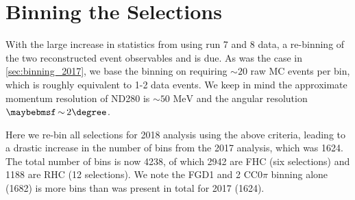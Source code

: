 \section{Binning the Selections}
With the large increase in statistics from using run 7 and 8 data, a re-binning of the two reconstructed event observables \pmu and \cosmu is due. As was the case in \autoref{sec:binning_2017}, we base the binning on requiring $\sim20$ raw MC events per bin, which is roughly equivalent to 1-2 data events. We keep in mind the approximate momentum resolution of ND280 is $\sim50\text{ MeV}$ and the angular resolution $\sim2\degree$.

Here we re-bin all selections for 2018 analysis using the above criteria, leading to a drastic increase in the number of bins from the 2017 analysis, which was 1624. The total number of bins is now 4238, of which 2942 are FHC (six selections) and 1188 are RHC (12 selections). We note the FGD1 and 2 CC0$\pi$ binning alone (1682) is more bins than was present in total for 2017 (1624).

